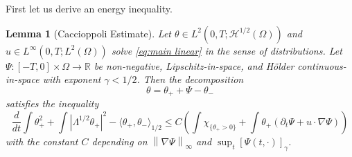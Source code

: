 \documentclass[11pt]{amsart}
\newtheorem{lemma}[theorem]{Lemma}
\theoremstyle{remark}
\theoremstyle{definition}
\newcommand{\R}{\mathbb{R}}
\newcommand{\chevron}[1]{\langle #1 \rangle}
\newcommand{\norm}[1]{\left\lVert#1\right\rVert}
\newcommand{\paren}[1]{\left( #1 \right)}
\newcommand{\bracket}[1]{\left[ #1 \right]}
\newcommand{\abs}[1]{\left\lvert #1 \right\rvert}
\newcommand{\del}{\partial}
\newcommand{\grad}{\nabla}
\newcommand{\ddt}{\frac{d}{dt}}
\newcommand{\indic}[1]{\chi_{\{#1\}}}
\newcommand{\HD}{\mathcal{H}}
\begin{document}
First let us derive an energy inequality.  

\begin{lemma}[Caccioppoli Estimate] \label{thm:caccioppoli}
Let $\theta \in L^2(0,T; \HD^{1/2}(\Omega))$ and $u \in L^\infty(0,T; L^2(\Omega))$ solve \eqref{eq:main linear} in the sense of distributions.  Let $\Psi: [-T,0]\times \Omega \to \R$ be non-negative, Lipschitz-in-space, and H\"{o}lder continuous-in-space with exponent $\gamma < 1/2$.  Then the decomposition
\[ \theta = \theta_+ + \Psi - \theta_- \]
satisfies the inequality
\[ \ddt \int \theta_+^2 + \int \abs{\Lambda^{1/2} \theta_+}^2 - \chevron{\theta_+,\theta_-}_{1/2} \leq C \paren{ \int \indic{\theta_+ > 0} + \int \theta_+ (\del_t \Psi + u\cdot\grad\Psi) } \]
with the constant $C$ depending on $\norm{\grad \Psi}_\infty$ and $\sup_t \bracket{\Psi(t,\cdot)}_\gamma$.  

\end{lemma}
\end{document}
